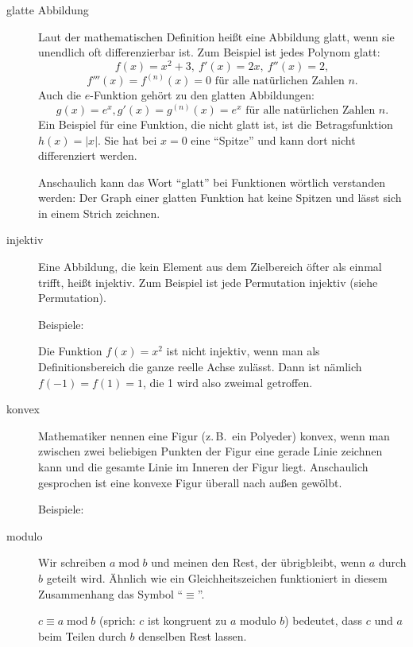 \documentclass[10pt,a5paper,twoside]{article}
\begin{document}
\begin{description}
\item[glatte Abbildung] Laut der mathematischen Definition heißt eine Abbildung glatt, wenn sie unendlich oft differenzierbar ist. 
Zum \nopagebreak Beispiel ist jedes Polynom glatt: 
\[f(x) = x^2 + 3,\ f'(x) = 2x,\ f''(x) = 2, \]
\[f'''(x) = f^{(n)}(x) = 0 \text{ für alle natürlichen Zahlen } n.\]
Auch die $e$-Funktion gehört zu den glatten Abbildungen: 
\[g(x) = e^x, g'(x) = g^{(n)}(x) = e^x \text{ für alle natürlichen Zahlen } n.\]
Ein Beispiel für eine Funktion, die nicht glatt ist, ist die Betragsfunktion $h(x) = |x|.$ Sie hat bei $x=0$ eine \enquote{Spitze} und kann dort nicht differenziert werden. 

Anschaulich kann das Wort \enquote{glatt} bei Funktionen wörtlich verstanden werden: Der Graph einer glatten Funktion hat keine Spitzen und lässt sich in einem Strich zeichnen. 

\item[injektiv] Eine Abbildung, die kein Element aus dem Zielbereich öfter als einmal trifft, heißt injektiv. 
Zum Beispiel ist jede Permutation injektiv (siehe Permutation). 

Beispiele: 
\begin{figure}[H] 
\centering 
\def\svgwidth{200pt} 
 
\end{figure}
Die Funktion $f(x) = x^2$ ist nicht injektiv, wenn man als Definitionsbereich die ganze reelle Achse zulässt. Dann ist nämlich $f(-1) = f(1) = 1$, die 1 wird also zweimal getroffen. 

\item[konvex] Mathematiker nennen eine Figur (z.\,B.\ ein Polyeder) konvex, wenn man zwischen zwei beliebigen Punkten der Figur eine gerade Linie zeichnen kann und die gesamte Linie im Inneren der Figur liegt. 
Anschaulich gesprochen ist eine konvexe Figur überall nach außen gewölbt. 

Beispiele: 
\begin{figure}[H] 
\centering 
\def\svgwidth{270pt} 
 
\end{figure} 

\item[modulo] Wir schreiben $a \operatorname{mod} b$ und meinen den Rest, der übrigbleibt, wenn $a$ durch $b$ geteilt wird. 
Ähnlich wie ein Gleichheitszeichen funktioniert in diesem Zusammenhang das Symbol \enquote{$\equiv$}. 

$c\equiv a \operatorname{mod} b$ (sprich: $c$ ist kongruent zu $a$ modulo $b$) bedeutet, dass $c$ und $a$ beim Teilen durch $b$ denselben Rest lassen. 


\end{description}
\end{document}
